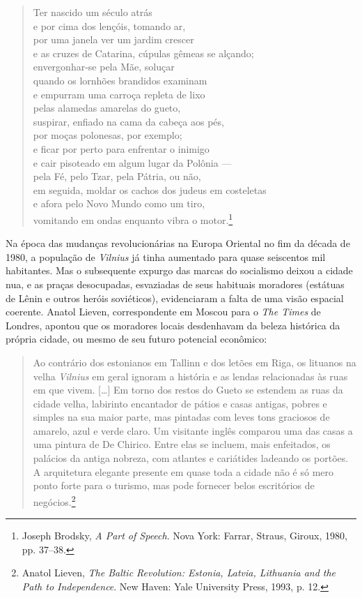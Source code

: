 %
\begin{verse}
Ter nascido um século atrás\\
e por cima dos lençóis, tomando ar,\\
por uma janela ver um jardim crescer\\
e as cruzes de Catarina, cúpulas gêmeas se alçando;\\
envergonhar-se pela Mãe, soluçar\\
quando os lornhões brandidos examinam\\
e empurram uma carroça repleta de lixo\\
pelas alamedas amarelas do gueto,\\
suspirar, enfiado na cama da cabeça aos pés,\\
por moças polonesas, por exemplo;\\
e ficar por perto para enfrentar o inimigo\\
e cair pisoteado em algum lugar da Polônia ---\\
pela Fé, pelo Tzar, pela Pátria, ou não,\\
em seguida, moldar os cachos dos judeus em \qb{}costeletas\\
e afora pelo Novo Mundo como um tiro,\\
vomitando em ondas enquanto vibra o motor.\footnote{Joseph Brodsky, \textit{A Part of Speech}. Nova York: Farrar, Straus, Giroux, 1980, pp. 37--38.}
\end{verse}

Na época das mudanças revolucionárias na Europa Oriental no fim da
década de 1980, a população de \textit{Vilnius} já tinha aumentado para quase
seiscentos mil habitantes. Mas o subsequente expurgo das marcas do
socialismo deixou a cidade nua, e as praças desocupadas, esvaziadas de
seus habituais moradores (estátuas de Lênin e outros heróis
soviéticos), evidenciaram a falta de uma visão espacial coerente. Anatol
Lieven, correspondente em Moscou para o \textit{The Times} de Londres,
apontou que os moradores locais desdenhavam da beleza histórica da
própria cidade, ou mesmo de seu futuro potencial econômico:

\begin{quote}
Ao contrário dos estonianos em Tallinn e dos letões em Riga, os lituanos
na velha \textit{Vilnius} em geral ignoram a história e as lendas relacionadas às
ruas em que vivem. [\ldots{}] Em torno dos restos do Gueto se estendem as
ruas da cidade velha, labirinto encantador de pátios e casas antigas,
pobres e simples na sua maior parte, mas pintadas com leves tons
graciosos de amarelo, azul e verde claro. Um visitante inglês comparou
uma das casas a uma pintura de De Chirico. Entre elas se incluem, mais
enfeitados, os palácios da antiga nobreza, com atlantes e cariátides
ladeando os portões. A arquitetura elegante presente em quase toda a
cidade não é só mero ponto forte para o turismo, mas pode fornecer belos
escritórios de negócios.\footnote{Anatol Lieven, \textit{The Baltic Revolution: Estonia, Latvia, Lithuania and the Path to Independence}. New Haven: Yale University Press, 1993, p. 12.} \end{quote}

